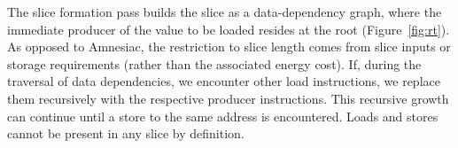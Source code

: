 The slice formation pass builds the slice as a data-dependency graph, where
the immediate producer of the value to be loaded resides at the root (Figure~\ref{fig:rt}).
As opposed to Amnesiac, the restriction to slice length comes from slice inputs or storage requirements (rather than the associated energy cost). 
If, during the traversal of data dependencies, we encounter other load instructions, we 
replace them recursively with the respective producer instructions. 
This recursive growth can continue until a store to the same address is encountered.
Loads and stores cannot be present 
in any slice by definition.

